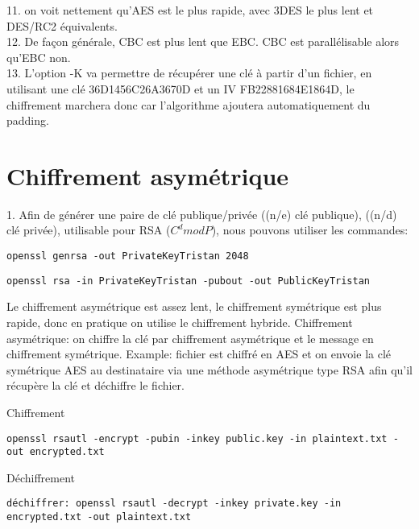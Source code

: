 \documentclass[12pt, oneside]{article}
\begin{document}
11. on voit nettement qu'AES est le plus rapide, avec 3DES le plus lent et DES/RC2 équivalents. \\

12. De façon générale, CBC est plus lent que EBC. CBC est parallélisable alors qu'EBC non. \\

13. L'option -K va permettre de récupérer une clé à partir d'un fichier, en utilisant une clé 36D1456C26A3670D et un IV FB22881684E1864D, le chiffrement marchera donc car l'algorithme ajoutera automatiquement du padding. 

\section{Chiffrement asymétrique}
1. Afin de générer une paire de clé publique/privée ((n/e) clé publique), ((n/d) clé privée), utilisable pour RSA (\(C^d mod P\)), nous pouvons utiliser les commandes:

\begin{verbatim}
openssl genrsa -out PrivateKeyTristan 2048
\end{verbatim}

\begin{verbatim}
openssl rsa -in PrivateKeyTristan -pubout -out PublicKeyTristan
\end{verbatim}
Le chiffrement asymétrique est assez lent, le chiffrement symétrique est plus rapide, donc en pratique on utilise le chiffrement hybride. 
Chiffrement asymétrique: on chiffre la clé par chiffrement asymétrique et le message en chiffrement symétrique. Example: fichier est chiffré en AES et on envoie la clé symétrique AES au destinataire via une méthode asymétrique type RSA afin qu'il récupère la clé et déchiffre le fichier. 

Chiffrement
\begin{verbatim}
openssl rsautl -encrypt -pubin -inkey public.key -in plaintext.txt -out encrypted.txt
\end{verbatim}

Déchiffrement
\begin{verbatim}
déchiffrer: openssl rsautl -decrypt -inkey private.key -in encrypted.txt -out plaintext.txt
\end{verbatim}
\end{document}
